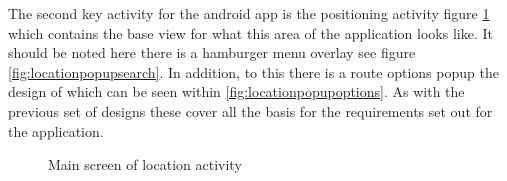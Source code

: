 The second key activity for the android app is the positioning activity figure \ref{fig:locationactivity} which contains the base view for what this area of the application looks like. It should be noted here there is a hamburger menu overlay see figure \ref{fig:locationpopupsearch}. In addition, to this there is a route options popup the design of which can be seen within \ref{fig:locationpopupoptions}. As with the previous set of designs these cover all the basis for the requirements set out for the application.
\begin{figure}[h]
	\centering
	\caption{Main screen of location activity}
	\label{fig:locationactivity}
\end{figure}
